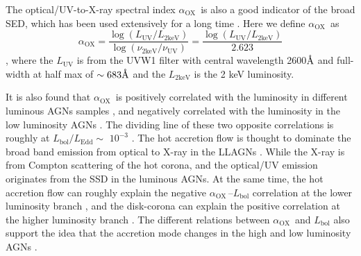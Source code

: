 \documentclass[twocolumn]{aastex63}
\newcommand{\alphaox}{$\alpha_\mathrm{OX}$}
\newcommand{\angstrom}{\text{\normalfont\AA}}
\begin{document}
The optical/UV-to-X-ray spectral index \alphaox\, is also a good indicator of the broad SED, which has been used extensively for a long time \citep[e.g.][]{1979ApJ...234L...9T}. Here we define \alphaox\, as 
\begin{equation}
\alpha_\mathrm{OX} = \frac{\log (L_\mathrm{UV} / L_\mathrm{2keV} )} {\log (\nu_\mathrm{2keV} /  \nu_\mathrm{UV} )}=\frac{\log (L_\mathrm{UV} / L_\mathrm{2keV} )}{2.623}
\label{definition_alpha_ox}
\end{equation}
, where the $L_\mathrm{UV}$ is from the UVW1 filter with central wavelength {2600{$\angstrom$}} and full-width at half max of $\sim 683\angstrom$ \citep{2008MNRAS.383..627P} and the $L_\mathrm{2keV}$ is the 2 keV luminosity.



It is also found that  \alphaox\, is positively correlated with the luminosity in different luminous AGNs samples \citep[e.g.][]{2010A&A...512A..34L, 2013A&A...550A..71V,2016ApJ...819..154L}, and negatively correlated with the luminosity in the low luminosity AGNs \citep[e.g.][]{2011ApJ...739...64X,2017MNRAS.471.2848L}. The dividing line of these two opposite correlations is roughly at $L_\mathrm{bol}/L_\mathrm{Edd} \sim$ $10^{-3}$ \citep{2011ApJ...739...64X,2017MNRAS.471.2848L}. The hot accretion flow is thought to dominate the broad band emission from optical to X-ray in the LLAGNs \citep[see reviews in ][]{2014ARA&A..52..529Y}. While the X-ray is from Compton scattering of the hot corona, and the optical/UV emission originates from the SSD in the luminous AGNs. At the same time, the hot accretion flow can roughly explain the negative \alphaox\,--$L_\mathrm{bol}$ correlation at the lower luminosity branch \citep{2011ApJ...739...64X,2017MNRAS.471.2848L}, and the disk-corona can explain the positive correlation at the higher luminosity branch \citep{2017A&A...602A..79L, 2018MNRAS.480.1247K,2019A&A...628A.135A}. The different relations between \alphaox\, and $L_\mathrm{bol}$ also support the idea that the accretion mode changes in the high and low luminosity AGNs \citep[see][]{2011MNRAS.413.2259S,2019ApJ...883...76R}. 
\end{document}
